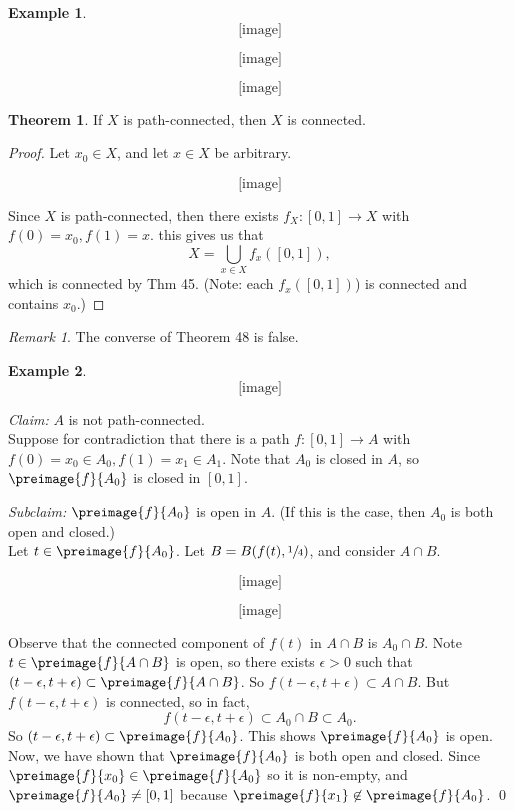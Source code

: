 \documentclass[a5paper]{article}
\theoremstyle{definition}%
\newtheorem{theorem}{Theorem}
\newtheorem*{example*}{Example}
\numberwithin{exercise}{section}
\theoremstyle{remark}%
\newtheorem*{remark*}{Remark}
\begin{document}
\begin{example*}
$$\text{[image]}$$

$$\text{[image]}$$

$$\text{[image]}$$
\end{example*}

\begin{highlight}
\begin{theorem}
If $X$ is path-connected, then $X$ is connected. 
\end{theorem}
\end{highlight}
\begin{proof}
Let $x_0\in X$, and let $x\in X$ be arbitrary. 

$$\text{[image]}$$

Since $X$ is path-connected, then there exists $f_X:[0,1]\to X$ with $f(0)=x_0, f(1)=x$. this gives us that 
$$X=\bigcup_{x\in X} f_x([0,1]),$$
which is connected by Thm 45. (Note: each $f_x([0,1])$) is connected and contains $x_0$.)
\end{proof}

\begin{highlight}
\begin{remark*}
The converse of Theorem 48 is false. 
\end{remark*}
\end{highlight}
\begin{example*}
$$\text{[image]}$$

\textit{Claim:} $A$ is not path-connected. \\
Suppose for contradiction that there is a path $f:[0,1]\to A$ with $f(0)=x_0\in A_0, f(1)=x_1\in A_1$. Note that $A_0$ is closed in $A$, so $\preimage{f}{A_0}$ is closed in $[0,1]$. 

\textit{Subclaim:} $\preimage{f}{A_0}$ is open in $A$. (If this is the case, then $A_0$ is both open and closed.) \\
Let $t\in\preimage{f}{A_0}$. Let $B=B(f(t), \sfrac{1}{4})$, and consider $A\cap B$.

$$\text{[image]}$$

$$\text{[image]}$$

Observe that the connected component of $f(t)$ in $A\cap B$ is $A_0\cap B$. Note $t\in \preimage{f}{A\cap B}$ is open, so there exists $\epsilon>0$ such that $(t-\epsilon, t+\epsilon)\subset\preimage{f}{A\cap B}$. So $f(t-\epsilon, t+\epsilon)\subset A\cap B$. But $f(t-\epsilon, t+\epsilon)$ is connected, so in fact, 
$$f(t-\epsilon, t+\epsilon)\subset A_0\cap B \subset A_0.$$
So $(t-\epsilon, t+\epsilon)\subset \preimage{f}{A_0}$. This shows $\preimage{f}{A_0}$ is open. \qedwhite \\
Now, we have shown that $\preimage{f}{A_0}$ is both open and closed. Since $\preimage{f}{x_0}\in \preimage{f}{A_0}$ so it is non-empty, and $\preimage{f}{A_0}\neq [0,1]$ because $\preimage{f}{x_1}\not\in \preimage{f}{A_0}$. \qed
\end{example*}
\end{document}
